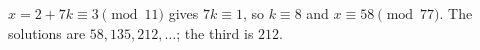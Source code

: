 $x=2+7k\equiv3\pmod{11}$ gives $7k\equiv1$, so $k\equiv8$ and $x\equiv58\pmod{77}$. The solutions are $58,135,212,\dots$; the third is $\boxed{212}$.
